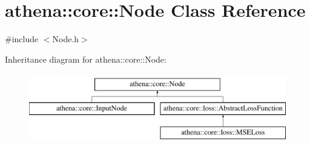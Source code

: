 \hypertarget{classathena_1_1core_1_1_node}{}\section{athena\+:\+:core\+:\+:Node Class Reference}
\label{classathena_1_1core_1_1_node}


{\ttfamily \#include $<$Node.\+h$>$}

Inheritance diagram for athena\+:\+:core\+:\+:Node\+:\begin{figure}[H]
\begin{center}
\leavevmode
\includegraphics[height=3.000000cm]{classathena_1_1core_1_1_node}
\end{center}
\end{figure}
